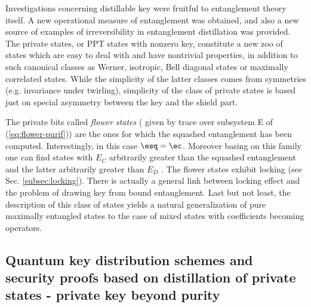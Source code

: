 \documentclass[rmp,12pt,preprint]{revtex4-2}
\begin{document}
Investigations concerning distillable key were fruitful to
entanglement theory itself. A new operational measure
of entanglement was obtained, and also a new source of examples of
irreversibility in entanglement distillation was provided.
The private states, or PPT states with nonzero key,
constitute a new zoo of states which are easy to deal with and have
nontrivial properties, in addition to such canonical classes as
Werner, isotropic, Bell diagonal states or maximally correlated
states.
While the simplicity of the latter classes comes from symmetries (e.g. invariance under twirling), simplicity of the class of private states is based just on special asymmetry between the key and the shield part.

 The private bits called {\it flower states} ( given by trace over subsystem E of (\ref{eq:flower-purif})) are the ones for which the squashed entanglement has been
computed. Interestingly, in this case $\esq=\ec$. Moreover basing on this family one can find states with $E_C$ arbitrarily greater than the squashed entanglement and the
latter arbitrarily greater than $E_D$ \cite{Winter-squashed-ent}. The
flower states exhibit locking (see Sec. \ref{subsec:locking}).  There is actually a general link between locking effect and the problem of
drawing key from bound entanglement. Last but not least, the
description of this class of states yields a natural generalization of
pure maximally entangled states to the case of mixed states with
coefficients becoming operators.

\subsection{Quantum key distribution schemes and security proofs
based on distillation of private states - private key beyond purity}
\end{document}
